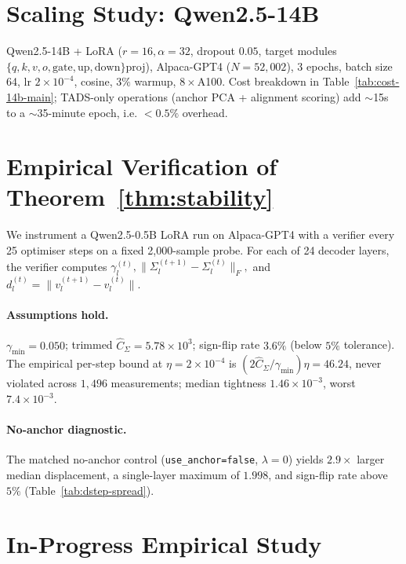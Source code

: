 \section{Scaling Study: Qwen2.5-14B}
\label{app:scaling}

Qwen2.5-14B + LoRA ($r=16, \alpha=32$, dropout $0.05$, target
modules $\{q,k,v,o,\text{gate},\text{up},\text{down}\}$proj),
Alpaca-GPT4 ($N=52{,}002$), 3 epochs, batch size 64, lr
$2\times10^{-4}$, cosine, $3\%$ warmup, $8\times$A100. Cost
breakdown in Table~\ref{tab:cost-14b-main}; \textsc{TADS}-only
operations (anchor PCA + alignment scoring) add $\sim$15s to a
$\sim$35-minute epoch, i.e. $<0.5\%$ overhead.

\section{Empirical Verification of Theorem~\ref{thm:stability}}
\label{app:thm-verification}

We instrument a Qwen2.5-0.5B LoRA run on Alpaca-GPT4 with a
verifier every 25 optimiser steps on a fixed 2{,}000-sample probe.
For each of 24 decoder layers, the verifier computes
$\gamma_l^{(t)}, \|\Sigma_l^{(t+1)}-\Sigma_l^{(t)}\|_F,$ and
$d_l^{(t)}=\|v_l^{(t+1)}-v_l^{(t)}\|$.

\paragraph{Assumptions hold.}
$\gamma_{\min}=0.050$; trimmed $\hat C_\Sigma=5.78\times10^3$;
sign-flip rate $3.6\%$ (below $5\%$ tolerance). The empirical
per-step bound at $\eta=2\times10^{-4}$ is
$(2\hat C_\Sigma / \gamma_{\min}) \eta = 46.24$, never violated
across $1{,}496$ measurements; median tightness
$1.46\times10^{-3}$, worst $7.4\times10^{-3}$.

\paragraph{No-anchor diagnostic.}
The matched no-anchor control (\texttt{use\_anchor=false},
$\lambda=0$) yields $2.9\times$ larger median displacement, a
single-layer maximum of $1.998$, and sign-flip rate above $5\%$
(Table~\ref{tab:dstep-spread}).

\section{In-Progress Empirical Study}
\label{app:inprogress}

